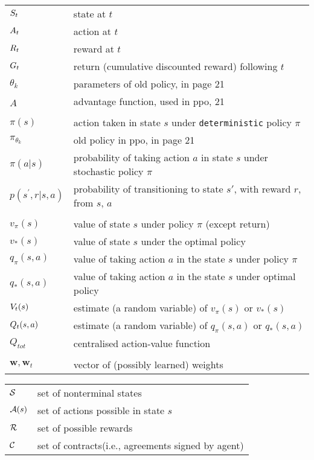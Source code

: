 \begin{tabular}{p{1.5cm} p{12cm}}
$S_t$  & state at $t$ \\
$A_t$  & action at $t$ \\
$R_t$  & reward at $t$ \\
$G_t$  & return (cumulative discounted reward) following $t$ \\
$\theta_{k}$ & parameters of old policy, in page 21 \\
$\hat{A}$ & advantage function, used in ppo, 21\\

\\
$\pi(s)$  & action taken in state $s$ under \texttt{deterministic} policy $\pi$ \\
$\pi_{\theta_{k}}$ & old policy in ppo, in page 21 \\
$\pi(a|s)$  & probability of taking action $a$ in state $s$ under stochastic policy $\pi$ \\
$p(s^{\prime},r|s,a)$  & probability of transitioning to state $s'$, with reward $r$, from $s$, $a$ \\
\\
$v_\pi(s)$ & value of state $s$ under policy $\pi$ (except return) \\
$v_*(s)$ & value of state $s$ under the optimal policy \\
$q_{\pi}(s, a)$ & value of taking action $a$ in the state $s$ under policy $\pi$ \\
$q_{*}(s, a)$ & value of taking action $a$ in the state $s$ under optimal policy \\
$V_{t}(s)$ & estimate (a random variable) of $v_{\pi}(s)$ or $v_{*}(s)$ \\ 
$Q_{t}(s, a)$ & estimate (a random variable) of $q_{\pi}(s, a)$ or $q_{*}(s, a)$ \\
$Q_{tot}$ &  centralised action-value function \\
\\
$\mathbf{w}, \mathbf{w}_{t}$ & vector of (possibly learned) weights \\


\end{tabular}


\begin{tabular}{p{1.5cm} p{12cm}}
$\mathcal{S}$ & set of nonterminal states \\
$\mathcal{A}(s)$ & set of actions possible in state $s$ \\
$\mathcal{R}$ & set of possible rewards \\
$\mathcal{C}$ & set of contracts(i.e., agreements signed by agent) \\
\end{tabular}